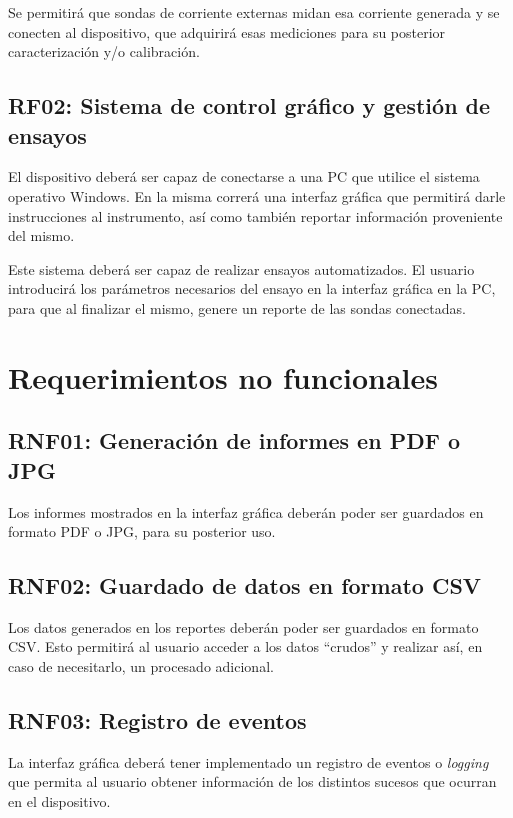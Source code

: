 \documentclass[titlepage, 12pt]{article}
\begin{document}
  Se permitirá que sondas de corriente externas midan esa corriente generada y se conecten al dispositivo, que adquirirá esas mediciones para su posterior caracterización y/o calibración.


  \subsection{RF02: Sistema de control gráfico y gestión de ensayos}
  El dispositivo deberá ser capaz de conectarse a una PC que utilice el sistema operativo Windows. En la misma correrá una interfaz gráfica que permitirá darle instrucciones al instrumento, así como también reportar información proveniente del mismo.

  Este sistema deberá ser capaz de realizar ensayos automatizados. El usuario introducirá los parámetros necesarios del ensayo en la interfaz gráfica en la PC, para que al finalizar el mismo, genere un reporte de las sondas conectadas.


\section{Requerimientos no funcionales}

  \subsection{RNF01: Generación de informes en PDF o JPG}
  Los informes mostrados en la interfaz gráfica deberán poder ser guardados en formato PDF o JPG, para su posterior uso.

  \subsection{RNF02: Guardado de datos en formato CSV}
  Los datos generados en los reportes deberán poder ser guardados en formato CSV. Esto permitirá al usuario acceder a los datos ``crudos'' y realizar así, en caso de necesitarlo, un procesado adicional.

  \subsection{RNF03: Registro de eventos}
  La interfaz gráfica deberá tener implementado un registro de eventos o \emph{logging} que permita al usuario obtener información de los distintos sucesos que ocurran en el dispositivo.
\end{document}
